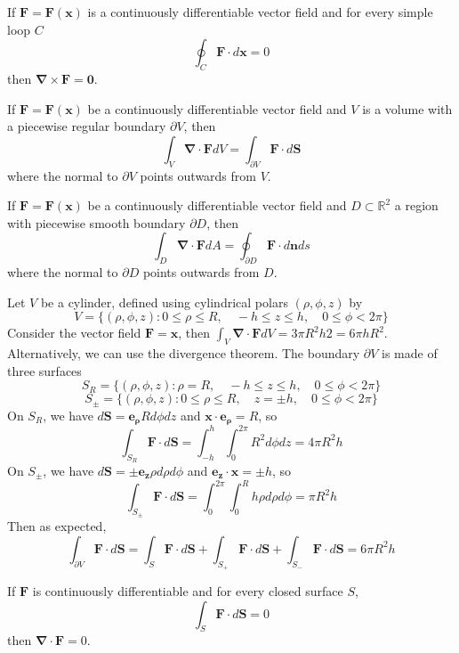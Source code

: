 \documentclass[a4paper]{article}
\begin{document}
\begin{prop}
If $\mathbf{F}=\mathbf{F}(\mathbf{x})$ is a continuously differentiable vector field and for every simple loop $C$ $$\oint_C\mathbf{F}\cdot d\mathbf{x}=0$$
then $\boldsymbol{\nabla}\times\mathbf{F}=\boldsymbol{0}$.
\end{prop}
\begin{thm}
If $\mathbf{F}=\mathbf{F}(\mathbf{x})$ be a continuously differentiable vector field and $V$ is a volume with a piecewise regular boundary $\partial V$, then
\begin{equation}
    \int_V\boldsymbol{\nabla}\cdot\mathbf{F}dV=\int_{\partial V}\mathbf{F}\cdot d\mathbf{S}\tag{1.24}
\end{equation}
where the normal to $\partial V$ points outwards from $V$.
\end{thm}
\begin{thm}
If $\mathbf{F}=\mathbf{F}(\mathbf{x})$ be a continuously differentiable vector field and $D\subset\mathbb{R}^2$ a region with piecewise smooth boundary $\partial D$, then
\begin{equation}
    \int_D\boldsymbol{\nabla}\cdot\mathbf{F}dA=\oint_{\partial D}\mathbf{F}\cdot d\mathbf{n}ds\tag{1.25}
\end{equation}
where the normal to $\partial D$ points outwards from $D$.
\end{thm}
\begin{eg}
Let $V$ be a cylinder, defined using cylindrical polars $(\rho,\phi,z)$ by
$$V=\{(\rho,\phi,z):0\leq\rho\leq R,\quad -h\leq z\leq h,\quad 0\leq\phi<2\pi\}$$
Consider the vector field $\mathbf{F}=\mathbf{x}$, then $\int_V\boldsymbol{\nabla}\cdot\mathbf{F}dV=3\pi R^2h2=6\pi hR^2$. Alternatively, we can use the divergence theorem. The boundary $\partial V$ is made of three surfaces
$$S_R=\{(\rho,\phi,z):\rho=R,\quad -h\leq z\leq h,\quad 0\leq\phi<2\pi\}$$
$$S_\pm=\{(\rho,\phi,z):0\leq\rho\leq R,\quad z=\pm h,\quad 0\leq\phi<2\pi\}$$
On $S_R$, we have $d\mathbf{S}=\boldsymbol{e_\rho}Rd\phi dz$ and $\mathbf{x}\cdot\boldsymbol{e_\rho}=R$, so
$$\int_{S_R}\mathbf{F}\cdot d\mathbf{S}=\int_{-h}^h\int_0^{2\pi}R^2d\phi dz=4\pi R^2h$$
On $S_\pm$, we have $d\mathbf{S}=\pm\mathbf{e_z}\rho d\rho d\phi$ and $\mathbf{e_z}\cdot\mathbf{x}=\pm h$, so
$$\int_{S_\pm}\mathbf{F}\cdot d\mathbf{S}=\int_0^{2\pi}\int_0^Rh\rho d\rho d\phi=\pi R^2h$$
Then as expected,
$$\int_{\partial V}\mathbf{F}\cdot d\mathbf{S}=\int_S\mathbf{F}\cdot d\mathbf{S}+\int_{S_+}\mathbf{F}\cdot d\mathbf{S}+\int_{S_-}\mathbf{F}\cdot d\mathbf{S}=6\pi R^2h$$
\end{eg}
\begin{prop}
If $\mathbf{F}$ is continuously differentiable and for every closed surface $S$,
$$\int_S\mathbf{F}\cdot d\mathbf{S}=0$$
then $\boldsymbol{\nabla}\cdot\mathbf{F}=0$.
\end{prop}
\newpage
\end{document}
